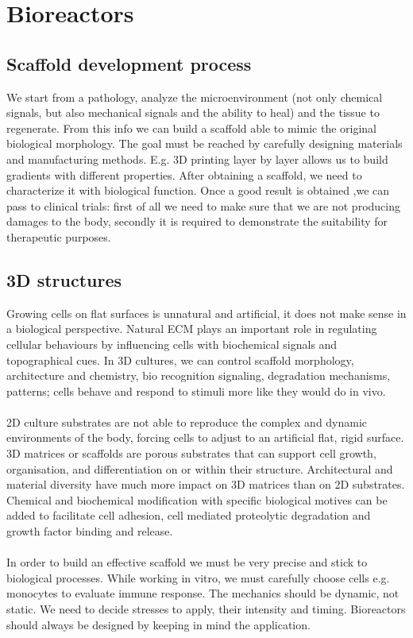 \graphicspath{{chapters/10/images/}}
\chapter{Bioreactors}

\section{Scaffold development process}
We start from a pathology, analyze the microenvironment (not only chemical signals, but also mechanical signals and the ability to heal) and the tissue to regenerate. 
From this info we can build a scaffold able to mimic the original biological morphology. 
The goal must be reached by carefully designing materials and manufacturing methods. 
E.g. 3D printing layer by layer allows us to build gradients with different properties. 
After obtaining a scaffold, we need to characterize it with biological function. 
Once a good result is obtained ,we can pass to clinical trials: first of all we need to make sure that we are not producing damages to the body, secondly it is required to demonstrate the suitability for therapeutic purposes.

\section{3D structures}
Growing cells on flat surfaces is unnatural and artificial, it does not make sense in a biological perspective.
Natural ECM plays an important role in regulating cellular behaviours by influencing cells with biochemical signals and topographical cues.
In 3D cultures, we can control scaffold morphology, architecture and chemistry, bio recognition signaling, degradation mechanisms, patterns; cells behave and respond to stimuli more like they would do in vivo.
\\
\\
\noindent
2D culture substrates are not able to reproduce the complex and dynamic environments of the body, forcing cells to adjust to an artificial flat, rigid surface. 
3D matrices or scaffolds are porous substrates that can support cell growth, organisation, and differentiation on or within their structure. 
Architectural and material diversity have much more impact on 3D matrices than on 2D substrates. 
Chemical and biochemical modification with specific biological motives can be added to facilitate cell adhesion, cell mediated proteolytic degradation and growth factor binding and release. 
\\
\\
\noindent
In order to build an effective scaffold we must be very precise and stick to biological processes.  
While working in vitro, we must carefully choose cells e.g. monocytes to evaluate immune response. 
The mechanics should be dynamic, not static. 
We need to decide stresses to apply, their intensity and timing. 
Bioreactors should always be designed by keeping in mind the application.

